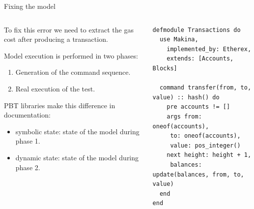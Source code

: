 \documentclass[aspectratio=169, 10pt, handout]{beamer}
\begin{document}
\begin{frame}[label={sec:org39f0931},fragile]{Fixing the model}
 \begin{columns}
\begin{column}{0.44\columnwidth}
To fix this error we need to extract the gas cost after producing a transaction.

\vspace{10pt}

Model execution is performed in two phases:
\begin{enumerate}
\item Generation of the command sequence.
\item Real execution of the test.
\end{enumerate}

\vspace{10pt}

PBT libraries make this difference in documentation:
\begin{itemize}
\item symbolic state: state of the model during phase 1.
\item dynamic state: state of the model during phase 2.
\end{itemize}
\end{column}

\begin{column}{0.52\columnwidth}
\onslide<+->
\lstset{language=elixir,label= ,caption= ,captionpos=b,numbers=none,style=display}
\begin{lstlisting}
defmodule Transactions do
  use Makina,
    implemented_by: Etherex,
    extends: [Accounts, Blocks]

  command transfer(from, to, value) :: hash() do
    pre accounts != []
    args from: oneof(accounts),
	 to: oneof(accounts),
	 value: pos_integer()
    next height: height + 1,
	 balances: update(balances, from, to, value)
  end
end
\end{lstlisting}
\end{column}
\end{columns}
\end{frame}
\end{document}
